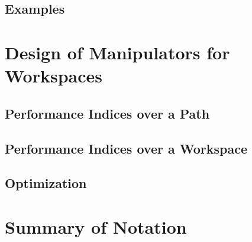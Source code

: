  \subsection{Examples}

\section{Design of Manipulators for Workspaces}
\subsection{Performance Indices over a Path}
\subsection{Performance Indices over a Workspace}
\subsection{Optimization}

\section{Summary of Notation}


